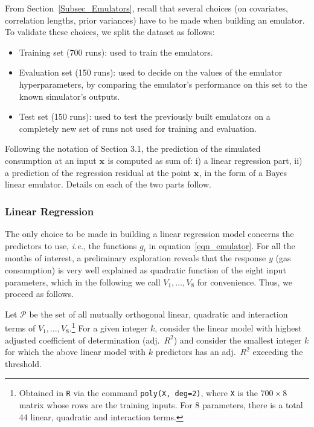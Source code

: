 \documentclass[preprint,12pt, sort&compress]{elsarticle}
\newcommand{\bd}[1]{\boldsymbol{#1}}
\newcommand{\x}[1][]{\bd{x_{#1}}}
\begin{document}
From Section~\ref{Subsec_Emulators}, recall that several choices (on covariates, correlation lengths, prior variances) have to be made when building an emulator. To validate these choices, we split the dataset as follows:
\begin{itemize}
\item Training set (700 runs): used to train the emulators.
\item Evaluation set (150 runs): used to decide on the values of the emulator hyperparameters, by comparing the emulator's performance on this set to the known simulator's outputs.
\item Test set (150 runs): used to test the previously built emulators on a completely new set of runs not used for training and evaluation.
\end{itemize}
Following the notation of Section 3.1, the prediction of the simulated consumption at an input  $\x$ is computed as sum of: i) a linear regression part, ii) a prediction of the regression residual at the point $\x$, in the form of a Bayes linear emulator. Details on each of the two parts follow.


\subsubsection{Linear Regression}\label{Subsec_LR}

The only choice to be made in building a linear regression model concerns the predictors to use, \textit{i.e.}, the functions $g_i$ in equation~\eqref{eqn_emulator}. For all the months of interest, a preliminary exploration reveals that the response $y$ (gas consumption) is very well explained as quadratic function of the eight input parameters, which in the following we call  $V_1, \dots, V_8$ for convenience. Thus, we proceed as follows.

Let $\mathcal{P}$ be the set of all mutually orthogonal linear, quadratic and interaction terms of $V_1, \dots, V_8$.\footnote{Obtained in \texttt{R} via the command \texttt{poly(X, deg=2)}, where \texttt{X} is the $700 \times 8$ matrix whose rows are the training inputs. For 8 parameters, there is a total 44 linear, quadratic and interaction terms.}
For a given integer $k$, consider the linear model with highest adjusted coefficient of determination (adj.~$R^2$) and consider the smallest integer $k$ for which the above linear model with $k$ predictors has an adj.~$R^2$ exceeding the threshold.
\end{document}
